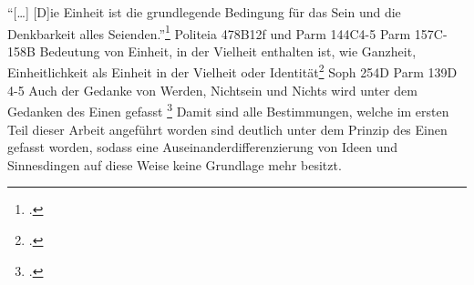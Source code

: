 \enquote{[\dots] [D]ie Einheit ist die grundlegende Bedingung für das Sein und die Denkbarkeit alles Seienden.}\footcite[vgl.][S. 97]{halfwassen2015spuren} Politeia 478B12f und Parm 144C4-5
 Parm 157C-158B
Bedeutung von Einheit, in der Vielheit enthalten ist, wie Ganzheit, Einheitlichkeit als Einheit in der Vielheit oder Identität\footcite[vgl.][S. 97]{halfwassen2015spuren} Soph 254D Parm 139D 4-5
Auch der Gedanke von Werden, Nichtsein und Nichts wird unter dem Gedanken des Einen gefasst \footcite[vgl.][S. 97]{halfwassen2015spuren}
Damit sind alle Bestimmungen, welche im ersten Teil dieser Arbeit angeführt worden sind deutlich unter dem Prinzip des Einen gefasst worden, sodass eine Auseinanderdifferenzierung von Ideen und Sinnesdingen auf diese Weise keine Grundlage mehr besitzt. 

